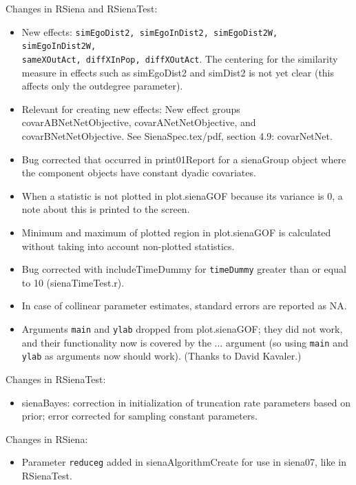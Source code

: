 \documentclass[a4paper,fleqn,11pt]{article}
\newcommand{\+}{\, + \,}
\newcommand{\sfn}[1]{\textsf{#1}}
\begin{document}
\begin{small}
\begin{itemize}
Changes in \textsf{RSiena} and \textsf{RSienaTest}:
\begin{itemize}
   \item New effects: \texttt{simEgoDist2, simEgoInDist2, simEgoDist2W, simEgoInDist2W,\\
         sameXOutAct, diffXInPop, diffXOutAct}. The centering for the similarity
         measure in effects such as simEgoDist2 and simDist2 is not yet clear
         (this affects only the outdegree parameter).
   \item  Relevant for creating new effects:
        New effect groups  \sfn{covarABNetNetObjective},
         \sfn{covarANetNetObjective}, and \sfn{covarBNetNetObjective}.
    	See \sfn{SienaSpec.tex/pdf}, section 4.9: \sfn{covarNetNet}.
   \item Bug corrected that occurred in \textsf{print01Report} for a \sfn{sienaGroup} object
     where the component objects have constant dyadic covariates.
   \item When a statistic is not plotted in \sfn{plot.sienaGOF} because
     its variance is 0, a note about this is printed to the screen.
   \item Minimum and maximum of plotted region in \sfn{plot.sienaGOF}
     is calculated without taking into account non-plotted statistics.
   \item Bug corrected with includeTimeDummy for \texttt{timeDummy} greater than
     or equal to 10 (\sfn{sienaTimeTest.r}).
   \item In case of collinear parameter estimates, standard errors
     are reported as NA.
   \item Arguments \texttt{main} and \texttt{ylab} dropped from
     \sfn{plot.sienaGOF}; they did
     not work, and their functionality now is covered by the ...
     argument (so using \texttt{main} and \texttt{ylab} as arguments now should work).
     (Thanks to David Kavaler.)
\end{itemize}
Changes in \textsf{RSienaTest}:
\begin{itemize}
   \item \textsf{sienaBayes}: correction in initialization of truncation rate parameters
     based on prior; error corrected for sampling constant parameters.
\end{itemize}
Changes in RSiena:
\begin{itemize}
   \item Parameter \texttt{reduceg} added in \textsf{sienaAlgorithmCreate}
   for use in \textsf{siena07}, like in \textsf{RSienaTest}.
\end{itemize}



\end{itemize}
\end{small}
\end{document}

